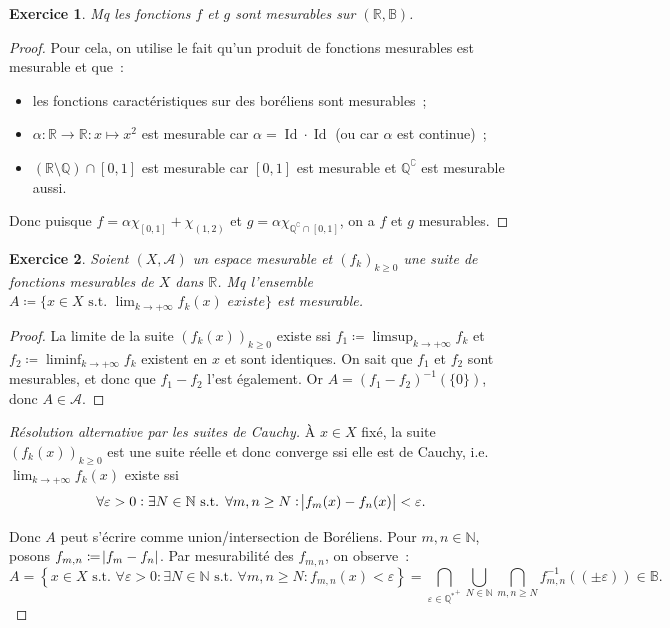 \documentclass{article}
\newtheorem{ex}{Exercice}[section]
\newcommand{\pinfty}{{+\infty}}
\newcommand{\st}{\text{ s.t. }}
\newcommand{\C}{\complement}
\newcommand{\N}{{\mathbb N}}
\newcommand{\Q}{{\mathbb Q}}
\newcommand{\R}{{\mathbb R}}
\newcommand{\B}{{\mathbb B}}
\DeclareMathOperator{\Id}{Id}
\begin{document}
\begin{ex} Mq les fonctions $f$ et $g$ sont mesurables sur $(\R, \B)$.
\end{ex}

\begin{proof} Pour cela, on utilise le fait qu'un produit de fonctions mesurables est mesurable et que~:
\begin{itemize}
	\item les fonctions caractéristiques sur des boréliens sont mesurables~;
	\item $\alpha : \R \to \R : x \mapsto x^2$ est mesurable car $\alpha = \Id \cdot \Id$ (ou car $\alpha$ est continue)~;
	\item $(\R \setminus \Q) \cap [0, 1]$ est mesurable car $[0, 1]$ est mesurable et $\Q^\C$ est mesurable aussi.
\end{itemize}

Donc puisque $f = \alpha\chi_{[0, 1]} + \chi_{(1, 2)}$ et $g = \alpha\chi_{\Q^\C \cap [0, 1]}$, on a $f$ et $g$ mesurables.
\end{proof}

\begin{ex} Soient $(X, \mathcal A)$ un espace mesurable et $(f_k)_{k \geq 0}$ une suite de fonctions mesurables de $X$ dans $\R$. Mq
l'ensemble $A \coloneqq \{x \in X \st \lim_{k \to \pinfty}f_k(x) \textit{ existe}\}$ est mesurable.
\end{ex}

\begin{proof} La limite de la suite $(f_k(x))_{k \geq 0}$ existe ssi $f_1 \coloneqq \limsup_{k \to \pinfty}f_k$ et $f_2 \coloneqq \liminf_{k \to \pinfty}f_k$ existent en $x$
et sont identiques. On sait que $f_1$ et $f_2$ sont mesurables, et donc que $f_1 - f_2$ l'est également. Or $A = (f_1-f_2)^{-1}(\{0\})$, donc $A \in \mathcal A$.
\end{proof}

\begin{proof}[Résolution alternative par les suites de Cauchy] À $x \in X$ fixé, la suite $(f_k(x))_{k \geq 0}$ est une suite réelle et donc converge ssi elle est de Cauchy,
i.e. $\lim_{k \to \pinfty}f_k(x)$ existe ssi
\[\forall \varepsilon > 0 : \exists N \in \N \st \forall m, n \geq N : \abs {f_m(x) - f_n(x)} < \varepsilon.\]

Donc $A$ peut s'écrire comme union/intersection de Boréliens. Pour $m, n \in \N$, posons $f_{m,n} \coloneqq \abs {f_m-f_n}$. Par mesurabilité des $f_{m,n}$, on observe~:
\[A = \left\{x \in X \st \forall \varepsilon > 0 : \exists N \in \N \st \forall m, n \geq N : f_{m,n}(x) < \varepsilon\right\}
	= \bigcap_{\varepsilon \in {\Q^*}^+}\bigcup_{N \in \N}\bigcap_{m,n \geq N}f_{m,n}^{-1}((\pm \varepsilon)) \in \B.\]
\end{proof}
\end{document}
